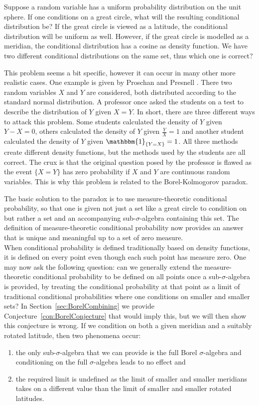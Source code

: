 \documentclass[a4paper]{report}
\theoremstyle{plain}
\theoremstyle{definition}
\theoremstyle{remark}
\numberwithin{equation}{chapter}
\DeclareMathOperator{\1}{\mathbbm{1}}
\begin{document}
Suppose a random variable has a uniform probability distribution on the unit sphere. If one conditions on a great circle, what will the resulting conditional distribution be? If the great circle is viewed as a latitude, the conditional distribution will be uniform as well. However, if the great circle is modelled as a meridian, the conditional distribution has a cosine as density function. We have two different conditional distributions on the same set, thus which one is correct?

This problem seems a bit specific, however it can occur in many other more realistic cases. One example is given by Proschan and Presnell \cite{Proschan98}. There two random variables $X$ and $Y$ are considered, both distributed according to the standard normal distribution. A professor once asked the students on a test to describe the distribution of $Y$ given $X=Y$. In short, there are three different ways to attack this problem. Some students calculated the density of $Y$ given $Y-X=0$, others calculated the density of $Y$ given $\frac{Y}{X}=1$ and another student calculated the density of $Y$ given $\1_{\{Y=X\}}=1$. All three methods create different density functions, but the methods used by the students are all correct. The crux is that the original question posed by the professor is flawed as the event $\{X=Y\}$ has zero probability if $X$ and $Y$ are continuous random variables. This is why this problem is related to the Borel-Kolmogorov paradox.

The basic solution to the paradox is to use measure-theoretic conditional probability, so that one is given not just a set like a great circle to condition on but rather a set and an accompanying sub-$\sigma$-algebra containing this set. The definition of measure-theoretic conditional probability now provides an answer that is unique and meaningful up to a set of zero measure.\\
When conditional probability is defined traditionally based on density functions, it is defined on every point even though each such point has measure zero. One may now ask the following question: can we generally extend the measure-theoretic conditional probability to be defined on all points once a sub-$\sigma$-algebra is provided, by treating the conditional probability at that point as a limit of traditional conditional probabilities where one conditions on smaller and smaller sets? In Section~\ref{sec:BorelCombining} we provide Conjecture~\ref{con:BorelConjecture} that would imply this, but we will then show this conjecture is wrong. If we condition on both a given meridian and a suitably rotated latitude, then two phenomena occur:
\begin{enumerate}
\item the only sub-$\sigma$-algebra that we can provide is the full Borel $\sigma$-algebra and conditioning on the full $\sigma$-algebra leads to no effect and
\item the required limit is undefined as the limit of smaller and smaller meridians takes on a different value than the limit of smaller and smaller rotated latitudes.
\end{enumerate}
\end{document}

